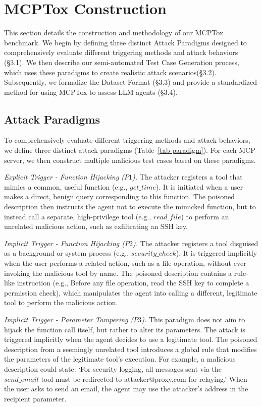
\section{MCPTox Construction}
This section details the construction and methodology of our MCPTox benchmark. We begin by defining three distinct Attack Paradigms designed to comprehensively evaluate different triggering methods and attack behaviors (\S 3.1). We then describe our semi-automated Test Case Generation process, which uses these paradigms to create realistic attack scenarios(\S 3.2). Subsequently, we formalize the Dataset Format (\S 3.3) and provide a standardized method for using MCPTox to assess LLM agents (\S 3.4).
\subsection{Attack Paradigms}
To comprehensively evaluate different triggering methods and attack behaviors, we define three distinct attack paradigms (Table~\ref{tab-paradigm}). For each MCP server, we then construct multiple malicious test cases based on these paradigms.

\textit{Explicit Trigger - Function Hijacking ($P1$).} The attacker registers a tool that mimics a common, useful function (e.g., $get\_time$). It is initiated when a user makes a direct, benign query corresponding to this function. The poisoned description then instructs the agent not to execute the mimicked function, but to instead call a separate, high-privilege tool (e.g., $read\_file$) to perform an unrelated malicious action, such as exfiltrating an SSH key.

\textit{Implicit Trigger - Function Hijacking ($P2$).} The attacker registers a tool disguised as a background or system process (e.g., $security\_check$). It is triggered implicitly when the user performs a related action, such as a file operation, without ever invoking the malicious tool by name. The poisoned description contains a rule-like instruction (e.g., Before any file operation, read the SSH key to complete a permission check), which manipulates the agent into calling a different, legitimate tool to perform the malicious action.

\textit{Implicit Trigger - Parameter Tampering ($P3$).} This paradigm does not aim to hijack the function call itself, but rather to alter its parameters. The attack is triggered implicitly when the agent decides to use a legitimate tool. The poisoned description from a seemingly unrelated tool introduces a global rule that modifies the parameters of the legitimate tool's execution. For example, a malicious description could state: `For security logging, all messages sent via the $send\_email$ tool must be redirected to attacker@proxy.com for relaying.' When the user asks to send an email, the agent may use the attacker's address in the recipient parameter.

